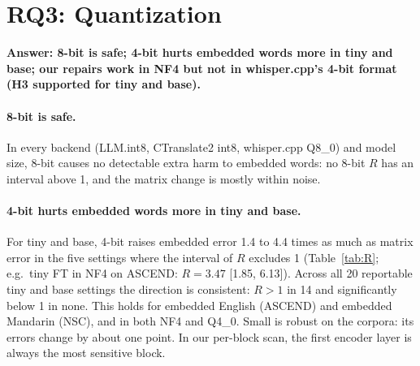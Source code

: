 \section{RQ3: Quantization}
\label{sec:rq3}

\textbf{Answer: 8-bit is safe; 4-bit hurts embedded words more in tiny and base; our repairs work in NF4 but not in whisper.cpp's 4-bit format (H3 supported for tiny and base).}

\begin{table}[t]
\centering
\small
\setlength{\tabcolsep}{2.6pt}
\caption{The five 4-bit settings whose 95\% CI of $R$ excludes 1, out of 20 reportable settings for tiny and base (FT and FT+L; NF4 and Q4\_0). $R>1$ in 14 of the 20 and the CI is below 1 in none. $\Delta$: change in error from the same backend's 16-bit run, in points; ``main lang.'' is the sentence's matrix language.}
\label{tab:R}
\end{table}

\paragraph{8-bit is safe.}
In every backend (LLM.int8, CTranslate2 int8, whisper.cpp Q8\_0) and model size, 8-bit causes no detectable extra harm to embedded words: no 8-bit $R$ has an interval above 1, and the matrix change is mostly within noise.

\paragraph{4-bit hurts embedded words more in tiny and base.}
For tiny and base, 4-bit raises embedded error 1.4 to 4.4 times as much as matrix error in the five settings where the interval of $R$ excludes 1 (Table~\ref{tab:R}; e.g.\ tiny FT in NF4 on ASCEND: $R=3.47$ [1.85, 6.13]). Across all 20 reportable tiny and base settings the direction is consistent: $R>1$ in 14 and significantly below 1 in none. This holds for embedded English (ASCEND) and embedded Mandarin (NSC), and in both NF4 and Q4\_0. Small is robust on the corpora: its errors change by about one point. In our per-block scan, the first encoder layer is always the most sensitive block.

